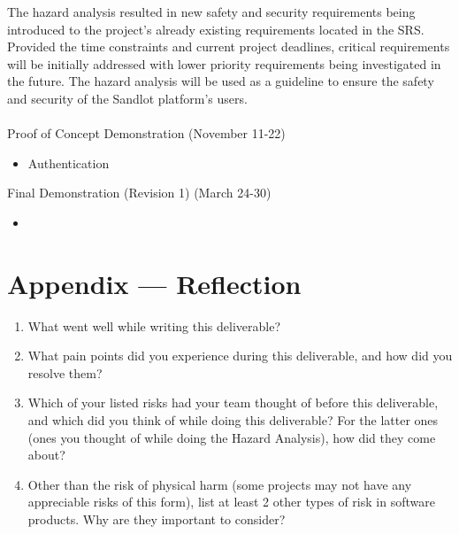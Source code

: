 \documentclass{article}
\begin{document}

The hazard analysis resulted in new safety and security requirements being
introduced to the project's already existing requirements located in the
SRS. Provided the time constraints and current project deadlines, critical
requirements will be initially addressed with lower priority requirements
being investigated in the future. The hazard analysis will be used as a guideline
to ensure the safety and security of the Sandlot platform's users.\\\\

Proof of Concept Demonstration (November 11-22)
\begin{itemize}
  \item Authentication
\end{itemize}

Final Demonstration (Revision 1) (March 24-30)
\begin{itemize}
  \item 
\end{itemize}

\newpage{}

\section*{Appendix --- Reflection}




\begin{enumerate}
    \item What went well while writing this deliverable? 
    \item What pain points did you experience during this deliverable, and how
    did you resolve them?
    \item Which of your listed risks had your team thought of before this
    deliverable, and which did you think of while doing this deliverable? For
    the latter ones (ones you thought of while doing the Hazard Analysis), how
    did they come about?
    \item Other than the risk of physical harm (some projects may not have any
    appreciable risks of this form), list at least 2 other types of risk in
    software products. Why are they important to consider?
\end{enumerate}
\end{document}
